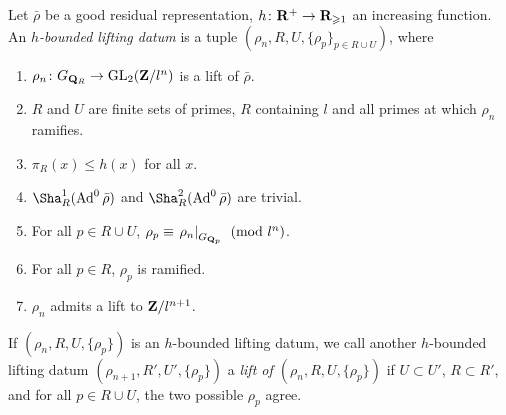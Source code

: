 \begin{definition}
Let $\bar\rho$ be a good residual representation, 
$h\colon \mathbf{R}^+ \to \mathbf{R}_{\geqslant 1}$ an 
increasing function. An \emph{$h$-bounded lifting datum} is a tuple 
$(\rho_n,R,U,\{\rho_p\}_{p\in R\cup U})$, where 
\begin{enumerate}
\item
$\rho_n\colon G_{\mathbf{Q}_R} \to \operatorname{GL}_2(\mathbf{Z}/l^n)$ is a lift of $\bar\rho$.

\item
$R$ and $U$ are finite sets of primes, $R$ containing $l$ and all primes at 
which $\rho_n$ ramifies. 

\item
$\pi_R(x)\leqslant h(x)$ for all $x$. 

\item
$\Sha_R^1(\Ad^0\bar\rho)$ and $\Sha_R^2(\Ad^0\bar\rho)$ are trivial. 

\item
For all $p\in R\cup U$, 
$\rho_p\equiv \left. \rho_n\right|_{G_{\mathbf{Q}_p}}\pmod{l^n}$. 

\item
For all $p\in R$, $\rho_p$ is ramified. 

\item
$\rho_n$ admits a lift to $\mathbf{Z}/l^{n+1}$. 
\end{enumerate}
\end{definition}

If $(\rho_n,R,U,\{\rho_p\})$ is an $h$-bounded lifting datum, we call 
another $h$-bounded lifting datum $(\rho_{n+1},R',U',\{\rho_p\})$ a \emph{lift 
of $(\rho_n,R,U,\{\rho_p\})$} if $U\subset U'$, $R\subset R'$, and for all 
$p\in R\cup U$, the two possible $\rho_p$ agree. 

